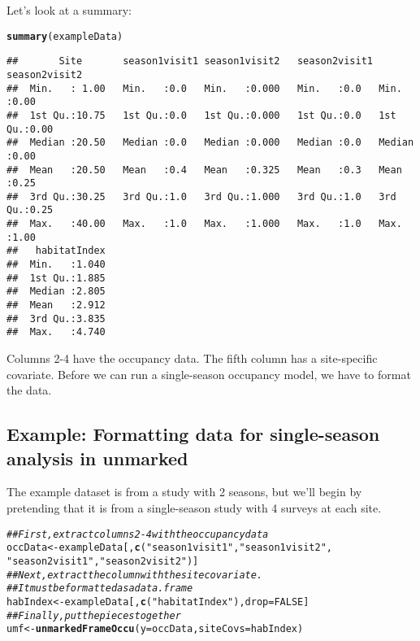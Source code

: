 \documentclass[12pt]{article}\usepackage[]{graphicx}\usepackage[]{color}
\makeatletter
\newcommand{\hlnum}[1]{\textcolor[rgb]{0.686,0.059,0.569}{#1}}%
\newcommand{\hlstr}[1]{\textcolor[rgb]{0.192,0.494,0.8}{#1}}%
\newcommand{\hlcom}[1]{\textcolor[rgb]{0.678,0.584,0.686}{\textit{#1}}}%
\newcommand{\hlstd}[1]{\textcolor[rgb]{0.345,0.345,0.345}{#1}}%
\newcommand{\hlkwb}[1]{\textcolor[rgb]{0.69,0.353,0.396}{#1}}%
\newcommand{\hlkwc}[1]{\textcolor[rgb]{0.333,0.667,0.333}{#1}}%
\newcommand{\hlkwd}[1]{\textcolor[rgb]{0.737,0.353,0.396}{\textbf{#1}}}%
\newenvironment{kframe}{%
 \def\at@end@of@kframe{}%
 \ifinner\ifhmode%
  \def\at@end@of@kframe{\end{minipage}}%
  \begin{minipage}{\columnwidth}%
 \fi\fi%
 \def\FrameCommand##1{\hskip\@totalleftmargin \hskip-\fboxsep
 \colorbox{shadecolor}{##1}\hskip-\fboxsep
     \hskip-\linewidth \hskip-\@totalleftmargin \hskip\columnwidth}%
 \MakeFramed {\advance\hsize-\width
   \@totalleftmargin\z@ \linewidth\hsize
   \@setminipage}}%
 {\par\unskip\endMakeFramed%
 \at@end@of@kframe}
\newenvironment{knitrout}{}{} %
\makeatother
\begin{document}
\newpage
Let's look at a summary:

\begin{knitrout}\footnotesize
{}\color{fgcolor}\begin{kframe}
\begin{alltt}
\hlkwd{summary}\hlstd{(exampleData)}
\end{alltt}
\begin{verbatim}
##       Site       season1visit1 season1visit2   season2visit1 season2visit2 
##  Min.   : 1.00   Min.   :0.0   Min.   :0.000   Min.   :0.0   Min.   :0.00  
##  1st Qu.:10.75   1st Qu.:0.0   1st Qu.:0.000   1st Qu.:0.0   1st Qu.:0.00  
##  Median :20.50   Median :0.0   Median :0.000   Median :0.0   Median :0.00  
##  Mean   :20.50   Mean   :0.4   Mean   :0.325   Mean   :0.3   Mean   :0.25  
##  3rd Qu.:30.25   3rd Qu.:1.0   3rd Qu.:1.000   3rd Qu.:1.0   3rd Qu.:0.25  
##  Max.   :40.00   Max.   :1.0   Max.   :1.000   Max.   :1.0   Max.   :1.00  
##   habitatIndex  
##  Min.   :1.040  
##  1st Qu.:1.885  
##  Median :2.805  
##  Mean   :2.912  
##  3rd Qu.:3.835  
##  Max.   :4.740
\end{verbatim}
\end{kframe}
\end{knitrout}

Columns 2-4 have the occupancy data. The fifth column has a
site-specific covariate. Before we can run a single-season occupancy
model, we have to format the data.




\subsection*{Example: Formatting data for single-season analysis in unmarked}


The example dataset is from a study with 2 seasons, but we'll begin by
pretending that it is from a single-season study with 4 surveys at
each site. 


\begin{knitrout}
\color{fgcolor}\begin{kframe}
\begin{alltt}
\hlcom{## First, extract columns 2-4 with the occupancy data}
\hlstd{occData} \hlkwb{<-} \hlstd{exampleData[,}\hlkwd{c}\hlstd{(}\hlstr{"season1visit1"}\hlstd{,} \hlstr{"season1visit2"}\hlstd{,}
                          \hlstr{"season2visit1"}\hlstd{,} \hlstr{"season2visit2"}\hlstd{)]}
\hlcom{## Next, extract the column with the site covariate.}
\hlcom{## It must be formatted as a data.frame}
\hlstd{habIndex} \hlkwb{<-} \hlstd{exampleData[,}\hlkwd{c}\hlstd{(}\hlstr{"habitatIndex"}\hlstd{),}\hlkwc{drop}\hlstd{=}\hlnum{FALSE}\hlstd{]}
\hlcom{## Finally, put the pieces together}
\hlstd{umf} \hlkwb{<-} \hlkwd{unmarkedFrameOccu}\hlstd{(}\hlkwc{y}\hlstd{=occData,} \hlkwc{siteCovs}\hlstd{=habIndex)}
\end{alltt}
\end{kframe}
\end{knitrout}
\end{document}
